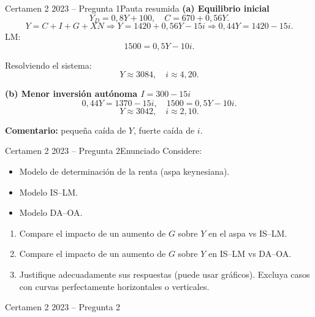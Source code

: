 \documentclass[aspectratio=169]{beamer}
\begin{document}
\begin{frame}{Certamen 2 2023 -- Pregunta 1}{Pauta resumida}
\small
\textbf{(a) Equilibrio inicial}
\[
Y_D = 0{,}8Y + 100,\quad
C = 670 + 0{,}56Y.
\]
\[
Y = C + I + G + XN
\Rightarrow
Y = 1420 + 0{,}56Y - 15i
\Rightarrow 0{,}44Y = 1420 - 15i.
\]
LM:
\[
1500 = 0{,}5Y - 10i.
\]

Resolviendo el sistema:
\[
Y \approx 3084,\quad i \approx 4{,}20.
\]

\textbf{(b) Menor inversión autónoma $I = 300 - 15i$}
\[
0{,}44Y = 1370 - 15i,
\quad
1500 = 0{,}5Y - 10i.
\]
\[
Y \approx 3042,\quad i \approx 2{,}10.
\]

\textbf{Comentario:} pequeña caída de $Y$, fuerte caída de $i$.
\end{frame}

\begin{frame}{Certamen 2 2023 -- Pregunta 2}{Enunciado}
\small
Considere:
\begin{itemize}
  \item Modelo de determinación de la renta (aspa keynesiana).
  \item Modelo IS--LM.
  \item Modelo DA--OA.
\end{itemize}

\begin{enumerate}[label=\alph*)]
  \item Compare el impacto de un aumento de $G$ sobre $Y$ en el aspa vs IS--LM.
  \item Compare el impacto de un aumento de $G$ sobre $Y$ en IS--LM vs DA--OA.
  \item Justifique adecuadamente sus respuestas (puede usar gráficos). Excluya casos con curvas perfectamente horizontales o verticales.
\end{enumerate}
\end{frame}

\begin{frame}{Certamen 2 2023 -- Pregunta 2}
  \vfill
  \centering
  \vfill
\end{frame}
\end{document}
